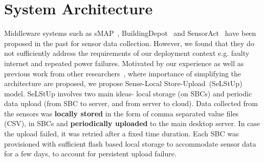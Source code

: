 \documentclass[10pt]{sensys-proc}
\newcommand{\selstup}{SeLStUp}
\newcommand{\paradigms}{Sense-Local Store-Upload~}
\newcommand{\selstups}{SeLStUp }
\begin{document}
\vspace{-1mm}
\section{System Architecture}	
\label{sec:architecture}
Middleware systems such as sMAP~\cite{smap}, BuildingDepot~\cite{buildingdepot} and SensorAct~\cite{Arjunan12} have been proposed in the past for sensor data collection. However, we found that they do not sufficiently address the requirements of our deployment context e.g. faulty internet and repeated power failures. Motivated by our experience as well as previous work from other researchers~\cite{hitchhiker_residential}, where importance of simplifying the architecture are proposed, we propose \paradigms (\selstup) model. \selstups involves two main ideas- local storage (on SBCs) and periodic data upload (from SBC to server, and from server to cloud). Data collected from the sensors was \textbf{locally stored} in the form of comma separated value files (CSV), in SBCs and \textbf{periodically uploaded} to the main desktop server. In case the upload failed, it was retried after a fixed time duration. Each SBC was provisioned with sufficient flash based local storage to accommodate sensor data for a few days, to account for persistent upload failure.
\end{document}
